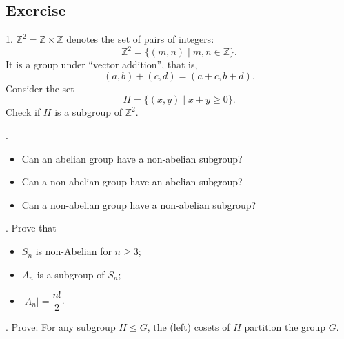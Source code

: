 \documentclass[12pt]{article}
\begin{document}
		\subsection{Exercise}
		1. $\mathbb{Z}^2 = \mathbb{Z} \times \mathbb{Z}$ denotes the set of pairs of integers:
		 	$$ \mathbb{Z}^2 = \{(m, n) \mid m, n \in \mathbb{Z}\}.$$ It is a group under ``vector addition'', 
		 	that is, $$(a, b) + (c, d) = (a + c, b + d).$$ Consider the set $$H = \{(x, y) \mid x + y \geqslant 0\}.$$ 
		 	Check if $H$ is a subgroup of $\mathbb{Z}^2$.
		\par {}. \begin{itemize}
			\item Can an abelian group have a non-abelian subgroup?
			\item Can a non-abelian group have an abelian subgroup?
			\item Can a non-abelian group have a non-abelian subgroup?
		\end{itemize}
		\par 
		. Prove that 
		\begin{itemize}
			\item $S_n$ is non-Abelian for $n \geqslant 3$;
			\item $A_n$ is a subgroup of $S_n$;
			\item  $|A_n| = \dfrac{n!}{2}$.
		\end{itemize}
		\par {}. Prove: For any subgroup $H \leq G$, the (left) cosets of $H$ partition the group $G$.
\end{document}
